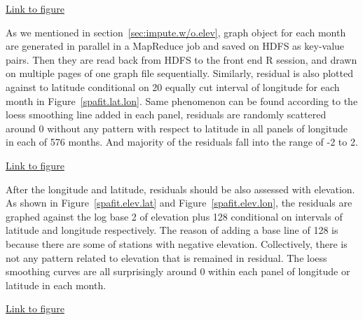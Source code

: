 \begin{framed}
\begin{center}
  \href{../plots/a1950/spafit/d2/span0.015/a1950.spaResid.vs.lon.lat.pdf}
  {Link to figure}
  \label{spafit.lon.lat}
\end{center}
\end{framed}

As we mentioned in section~\ref{sec:impute.w/o.elev}, graph object for each month 
are generated in parallel in a MapReduce job and saved on HDFS as key-value pairs. 
Then they are read back from HDFS to the front end R session, and drawn on multiple 
pages of one graph file sequentially. Similarly, residual is also plotted against 
to latitude conditional on 20 equally cut interval of longitude for each month 
in Figure~\href{../plots/a1950/spafit/d2/span0.015/a1950.spaResid.vs.lat.lon.pdf}
{\ref*{spafit.lat.lon}}. Same phenomenon can be found according to the loess 
smoothing line added in each panel, residuals are randomly scattered around 0 
without any pattern with respect to latitude in all panels of longitude in each 
of 576 months. And majority of the residuals fall into the range of -2 to 2.

\begin{framed}
\begin{center}
  \href{../plots/a1950/spafit/d2/span0.015/a1950.spaResid.vs.lat.lon.pdf}
  {Link to figure}
  \label{spafit.lat.lon}
\end{center}
\end{framed}

After the longitude and latitude, residuals should be also assessed with elevation.
As shown in 
Figure~\href{../plots/a1950/spafit/d2/span0.015/a1950.spaResid.vs.elev.lat.pdf}
{\ref*{spafit.elev.lat}} and 
Figure~\href{../plots/a1950/spafit/d2/span0.015/a1950.spaResid.vs.elev.lon.pdf}
{\ref*{spafit.elev.lon}}, the residuals are graphed against the log base 2 of
elevation plus 128 conditional on intervals of latitude and longitude respectively.
The reason of adding a base line of 128 is because there are some of stations 
with negative elevation. Collectively, there is not any pattern related to elevation
that is remained in residual. The loess smoothing curves are all surprisingly 
around 0 within each panel of longitude or latitude in each month.



\begin{framed}
\begin{center}
  \href{../plots/a1950/spafit/d2/span0.015/a1950.spaResid.vs.elev.lat.pdf}
  {Link to figure}
  \label{spafit.elev.lat}
\end{center}
\end{framed}

